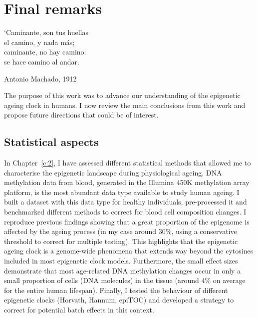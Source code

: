 
\chapter{Final remarks} \label{c:5}

\ifpdf
	\graphicspath{{Chapter5/Figs/pdf/}}
\else
	\graphicspath{{Chapter5/Figs/svg/}}
\fi

\epigraph{`Caminante, son tus huellas \\ el camino, y nada más; \\ caminante, no hay camino: \\ se hace camino al andar.}{Antonio Machado, 1912 \cite{Machado}}

\bigskip

The purpose of this work was to advance our understanding of the epigenetic ageing clock in humans. I now review the main conclusions from this work and propose future directions that could be of interest.


\section{Statistical aspects}

\bigskip

In Chapter~\ref{c:2}, I have assessed different statistical methods that allowed me to characterise the epigenetic landscape during physiological ageing. DNA methylation data from blood, generated in the Illumina 450K methylation array platform, is the most abundant data type available to study human ageing. I built a dataset with this data type for healthy individuals, pre-processed it and benchmarked different methods to correct for blood cell composition changes. I reproduce previous findings showing that a great proportion of the epigenome is affected by the ageing process (in my case around 30\%, using a conservative threshold to correct for multiple testing). This highlights that the epigenetic ageing clock is a genome-wide phenomena that extends way beyond the cytosines included in most epigenetic clock models. Furthermore, the small effect sizes demonstrate that most age-related DNA methylation changes occur in only a small proportion of cells (DNA molecules) in the tissue (around 4\% on average for the entire human lifespan). Finally, I tested the behaviour of different epigenetic clocks (Horvath, Hannum, epiTOC) and developed a strategy to correct for potential batch effects in this context.

